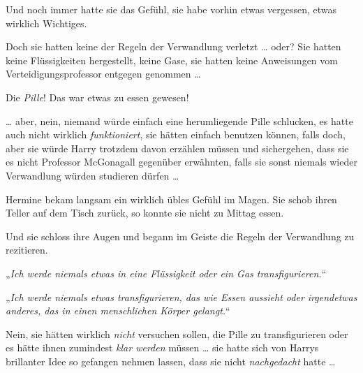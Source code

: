 Und noch immer hatte sie das Gefühl, sie habe vorhin etwas vergessen, etwas wirklich Wichtiges.

Doch sie hatten keine der Regeln der Verwandlung verletzt … oder? Sie hatten keine Flüssigkeiten hergestellt, keine Gase, sie hatten keine Anweisungen vom Verteidigungsprofessor entgegen genommen …

Die \emph{Pille}! Das war etwas zu essen gewesen!

… aber, nein, niemand würde einfach eine herumliegende Pille schlucken, es hatte auch nicht wirklich \emph{funktioniert}, sie hätten einfach  benutzen können, falls doch, aber sie würde Harry trotzdem davon erzählen müssen und sichergehen, dass sie es nicht Professor McGonagall gegenüber erwähnten, falls sie sonst niemals wieder Verwandlung würden studieren dürfen …

Hermine bekam langsam ein wirklich übles Gefühl im Magen. Sie schob ihren Teller auf dem Tisch zurück, so konnte sie nicht zu Mittag essen.

Und sie schloss ihre Augen und begann im Geiste die Regeln der Verwandlung zu rezitieren.

„\emph{Ich werde niemals etwas in eine Flüssigkeit oder ein Gas transfigurieren.}“

„\emph{Ich werde niemals etwas transfigurieren, das wie Essen aussieht oder irgendetwas anderes, das in einen menschlichen Körper gelangt.}“

Nein, sie hätten wirklich \emph{nicht} versuchen sollen, die Pille zu transfigurieren oder es hätte ihnen zumindest \emph{klar werden} müssen … sie hatte sich von Harrys brillanter Idee so gefangen nehmen lassen, dass sie nicht \emph{nachgedacht} hatte …

